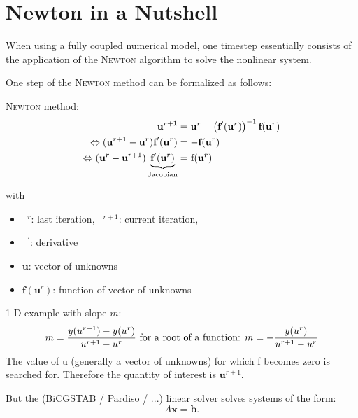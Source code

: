 

\chapter{Newton in a Nutshell}

When using a fully coupled numerical model, one timestep essentially consists of the application of the \textsc{Newton} algorithm to solve the nonlinear system.

One step of the \textsc{Newton} method can be formalized as follows:

\textsc{Newton} method: 
\begin{subequations}
\begin{align}
\label{NewtonGen}
\textbf{u}^{r+1} &= \textbf{u}^r -  \left(\textbf{f}^\prime (\textbf{u}^r) \right)^{-1} \textbf{f}(\textbf{u}^r) \\
\Leftrightarrow ( \textbf{u}^{r+1}-\textbf{u}^r) {\textbf{f}^{\prime}(\textbf{u}^r)} &= -\textbf{f}(\textbf{u}^r) \\
\Leftrightarrow ( \textbf{u}^r - \textbf{u}^{r+1}) \underbrace{\textbf{f}^{\prime}(\textbf{u}^r)}_{\textnormal{Jacobian}} &= \textbf{f}(\textbf{u}^r) \label{NewtonAsUsed}
\end{align}
\end{subequations}

\noindent with
\begin{itemize}
\item $\phantom{a}^r$: last iteration, $\phantom{a}^{r+1}$: current iteration,
\item $\phantom{a}^\prime$: derivative
\item $\textbf{u}$: vector of unknowns
\item $\textbf{f}(\textbf{u}^r)$: function of vector of unknowns
\end{itemize}

1-D example with slope $m$:
\begin{equation}
 m= \frac{y(u^{r+1})-y(u^{r})}{u^{r+1}-u^{r}} \textnormal{ for a root of a function: } m= - \frac{y(u^{r})}{u^{r+1}-u^{r}}
\end{equation}
The value of u (generally a vector of unknowns) for which f becomes zero is searched for. Therefore the quantity of interest is $\textbf{u}^{r+1}$.

But the (BiCGSTAB / Pardiso / ...) linear solver solves systems of the form:
\begin{equation}
\label{GenSysEq}
 A\textbf{x} = \textbf{b} .
\end{equation}

